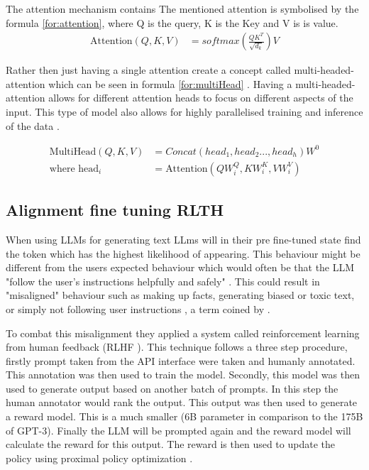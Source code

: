 The attention mechanism contains 
The mentioned attention is symbolised by the formula \ref{for:attention}, where Q is the query, K is the Key and V is is value. 
\begin{align}
\label{for:attention}
    \text{Attention}(Q,K,V) &= softmax(\frac{QK^T}{\sqrt{d_k}})V
\end{align}


Rather then just having a single attention create a concept called multi-headed-attention which can be seen in formula \ref{for:multiHead} \citep{vaswani2017attention} . Having a multi-headed-attention allows for different attention heads to focus on different aspects of the input. This type of model also allows for highly parallelised training and inference of the data \citep{min2023recent}. 

\begin{align}
\label{for:multiHead}
    \text{MultiHead}(Q,K,V) &= Concat(head_1, head_2 ... , head_h)W^0 \\
    \text{where head}_i &= \text{Attention}(QW_i^Q,KW^K_i, VW^V_i)
\end{align}



\subsection{Alignment fine tuning RLTH}
\label{sub:alignment}

When using LLMs for generating text LLms will in their pre fine-tuned state find the token which has the highest likelihood of appearing. This behaviour might be different from the users expected behaviour which would often be that the LLM "follow the user’s instructions helpfully and safely" \citep{ouyang2022training}. This could result in "misaligned" behaviour such as making up facts, generating biased or toxic text, or simply not following user instructions \citep{bommasani2021opportunities, bender2021dangers, kenton2021alignment}, a term coined by \citep{ouyang2022training}.

To combat this misalignment they applied a system called reinforcement learning from human feedback (RLHF \citep{christiano2017deep}). This technique follows a three step procedure, firstly prompt taken from the API interface were taken and humanly annotated. This annotation was then used to train the model. Secondly, this model was then used to generate output based on another batch of prompts. In this step the human annotator would rank the output. This output was then used to generate a reward model. This is a much smaller (6B parameter in comparison to the 175B of GPT-3). Finally the LLM will be prompted again and the reward model will calculate the reward for this output. The reward is then used to update the policy using proximal policy optimization \citep{ouyang2022training}.

